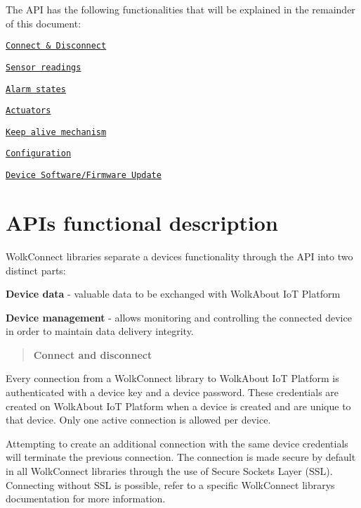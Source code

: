 The A\+PI has the following functionalities that will be explained in the remainder of this document\+:
\begin{DoxyItemize}
\item \href{#connect-and-disconnect}{\tt Connect \& Disconnect}
\item \href{#sensor-readings}{\tt Sensor readings}
\item \href{#alarms}{\tt Alarm states}
\item \href{#actuators}{\tt Actuators}
\item \href{#keep-alive-mechanism}{\tt Keep alive mechanism}
\item \href{#configuration}{\tt Configuration}
\item \href{#dfu}{\tt Device Software/\+Firmware Update}
\end{DoxyItemize}



 \section*{A\+PI\textquotesingle{}s functional description}



 Wolk\+Connect libraries separate a device\textquotesingle{}s functionality through the A\+PI into two distinct parts\+:


\begin{DoxyItemize}
\item {\bfseries Device data} -\/ valuable data to be exchanged with Wolk\+About IoT Platform
\item {\bfseries Device management} -\/ allows monitoring and controlling the connected device in order to maintain data delivery integrity.
\end{DoxyItemize}





\label{_connect-and-disconnect}%
 \begin{quote}
{\bfseries Connect and disconnect} \end{quote}
Every connection from a Wolk\+Connect library to Wolk\+About IoT Platform is authenticated with a device key and a device password. These credentials are created on Wolk\+About IoT Platform when a device is created and are unique to that device. Only one active connection is allowed per device.

Attempting to create an additional connection with the same device credentials will terminate the previous connection. The connection is made secure by default in all Wolk\+Connect libraries through the use of Secure Sockets Layer (S\+SL). Connecting without S\+SL is possible, refer to a specific Wolk\+Connect library\textquotesingle{}s documentation for more information.

